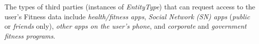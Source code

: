 The types of third parties  (instances of \textit{EntityType}) that can request access to the user's Fitness data include \textit{health/fitness apps}, \textit{Social Network (SN) apps} (\textit{public} or \textit{friends} only), \textit{other apps on the user's phone}, and \textit{corporate} and \textit{government fitness programs}.



%
%

